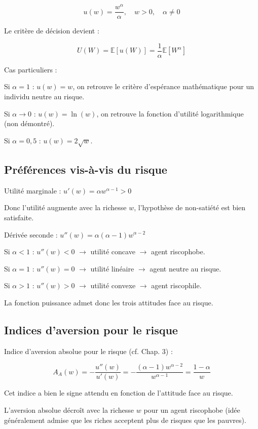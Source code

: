 \documentclass[a4paper, 12pt]{report}
\begin{document}
\[
u(w) = \frac{w^{\alpha}}{\alpha}, \quad w > 0, \quad \alpha \neq 0
\]

Le critère de décision devient :

\[
U(W) = \mathbb{E}[u(W)] = \frac{1}{\alpha} \mathbb{E}[W^{\alpha}]
\]

Cas particuliers :

Si \(\alpha = 1\) : \(u(w) = w\), on retrouve le critère d'espérance mathématique pour un individu neutre au risque.

Si \(\alpha \to 0\) : \(u(w) = \ln(w)\), on retrouve la fonction d'utilité logarithmique (non démontré).

Si \(\alpha = 0{,}5\) : \(u(w) = 2 \sqrt{w}\).

\subsection{Préférences vis-à-vis du risque}

Utilité marginale : \( u'(w) = \alpha w^{\alpha - 1} > 0 \)

Donc l'utilité augmente avec la richesse \( w \), l'hypothèse de non-satiété est bien satisfaite.

Dérivée seconde : \( u''(w) = \alpha (\alpha - 1) w^{\alpha - 2} \)

Si \( \alpha < 1 \) : \( u''(w) < 0 \) \(\rightarrow\) utilité concave \(\rightarrow\) agent riscophobe.

Si \( \alpha = 1 \) : \( u''(w) = 0 \) \(\rightarrow\) utilité linéaire \(\rightarrow\) agent neutre au risque.

Si \( \alpha > 1 \) : \( u''(w) > 0 \) \(\rightarrow\) utilité convexe \(\rightarrow\) agent riscophile.

La fonction puissance admet donc les trois attitudes face au risque.

\subsection{Indices d'aversion pour le risque}

Indice d'aversion absolue pour le risque (cf. Chap. 3) :

\[
A_A(w) = - \frac{u''(w)}{u'(w)} = - \frac{(\alpha - 1) w^{\alpha - 2}}{ w^{\alpha - 1}} = \frac{1 - \alpha}{w}
\]

Cet indice a bien le signe attendu en fonction de l'attitude face au risque.

L'aversion absolue décroît avec la richesse \( w \) pour un agent riscophobe (idée généralement admise que les riches acceptent plus de risques que les pauvres).
\end{document}
